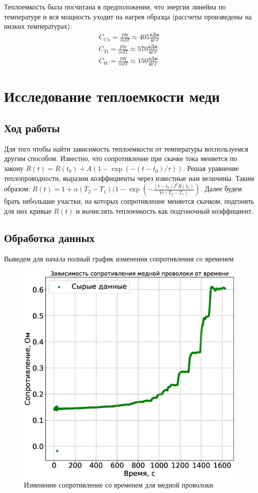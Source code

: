 \documentclass[a4paper,14pt]{extarticle}
\begin{document}
			Теплоемкость была посчитана в предположении, что энергия линейна по температуре и вся мощность уходит на нагрев образца (рассчеты произведены на низких температурах):
				\begin{equation}
				\begin{gathered}
				C_{Cu} = \frac{P \delta t}{m \delta T} \approx 405 \frac{\text{кДж}}{\text{кг} \cdot \text{г}} \\
				C_{Ti} = \frac{P \delta t}{m \delta T} \approx 570 \frac{\text{кДж}}{\text{кг} \cdot \text{г}} \\
				C_{W} = \frac{P \delta t}{m \delta T} \approx 150 \frac{\text{кДж}}{\text{кг} \cdot \text{г}}
				\end{gathered}
				\end{equation}
	\section{Исследование теплоемкости меди}
		\subsection{Ход работы}
			Для того чтобы найти зависимость теплоемкости от температуры воспользуемся другим способом. Известно, что сопротивление при скачке тока меняется по закону $R(t) = R(t_0) + A(1 - \exp(-(t-t_0)/\tau))$. Решая уравнение теплопроводности, выразим коэффициенты через известные нам величины. Таким образом: $R(t) = 1 + \alpha (T_2 - T_1) (1 - \exp(-\frac{(t - t_0)I^2 R(t_0)}{V c (T_2-T_1)})$. Далее будем брать небольшие участки, на которых сопротивление меняется скачком, подгонять для них кривые $R(t)$ и вычислять теплоемкость как подгоночный коэффициент.
		\subsection{Обработка данных}
			Выведем для начала полный график изменения сопротивления со временем
			\begin{figure}[h!]
				\centering
				\includegraphics[width=.60\linewidth]{Lab3_14.eps}
				\caption{Изменение сопротивление со временем для медной проволоки}
				\label{fig9}
			\end{figure}
			\newpage
			
\end{document}
